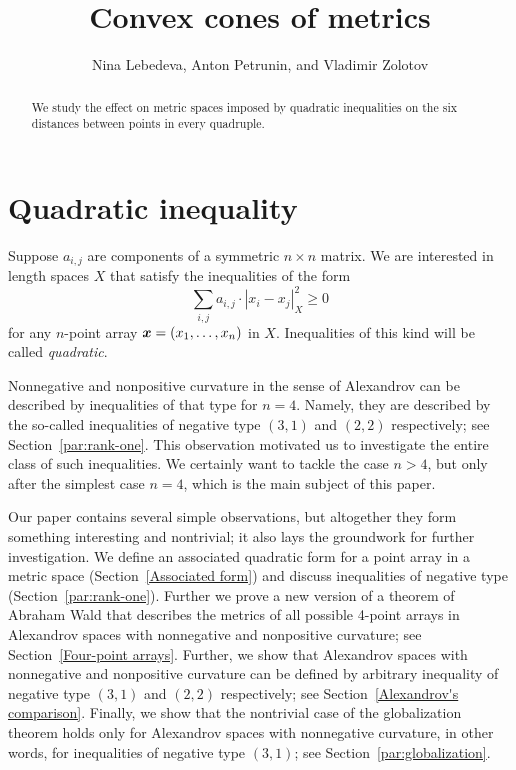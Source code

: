 \documentclass[a4paper,10pt]{article}
\def\thetitle{Convex cones of metrics}
\def\theauthors{Nina Lebedeva, Anton Petrunin, and Vladimir Zolotov}
\begin{document}


\title{\thetitle}
\author{\theauthors}
\date{}
\maketitle

\begin{abstract}
We study the effect on metric spaces imposed by quadratic inequalities on the six distances between points in every quadruple.
\end{abstract}

\section{Quadratic inequality}\label{par:quadratic-inq}

Suppose $a_{i,j}$ are components of a symmetric $n{\times}n$ matrix.
We are interested in length spaces $X$ that
satisfy the inequalities of the form
\[\sum_{i,j}a_{i,j}\cdot|x_i-x_j|_X^2\ge 0\]
for any $n$-point array $\bm{x}\z=(x_1,\dots,x_n)$ in $X$.
Inequalities of this kind will be called \emph{quadratic}.

Nonnegative and nonpositive curvature in the sense of Alexandrov can be described by inequalities of that type for $n=4$.
Namely, they are described by the so-called inequalities of negative type $(3,1)$ and $(2,2)$ respectively; see Section~\ref{par:rank-one}.
This observation motivated us to investigate the entire class of such inequalities.
We certainly want to tackle the case $n>4$, but only after the simplest case $n=4$, which is the main subject of this paper.

Our paper contains several simple observations, but altogether they form something interesting and nontrivial; it also lays the groundwork for further investigation.
We define an associated quadratic form for a point array in a metric space (Section~\ref{Associated form})
and discuss inequalities of negative type (Section~\ref{par:rank-one}).
Further we prove a new version of a theorem of Abraham Wald \cite[§ 7]{wald} that describes
the metrics of all possible 4-point arrays in Alexandrov spaces with nonnegative and nonpositive curvature;
see Section~\ref{Four-point arrays}.
Further, we show that Alexandrov spaces with nonnegative and nonpositive curvature can be defined by arbitrary inequality of negative type $(3,1)$ and $(2,2)$ respectively;
see Section~\ref{Alexandrov's comparison}.
Finally, we show that the nontrivial case of the globalization theorem holds only for Alexandrov spaces with nonnegative curvature, in other words, for inequalities of negative type $(3,1)$;
see Section~\ref{par:globalization}.
\end{document}
